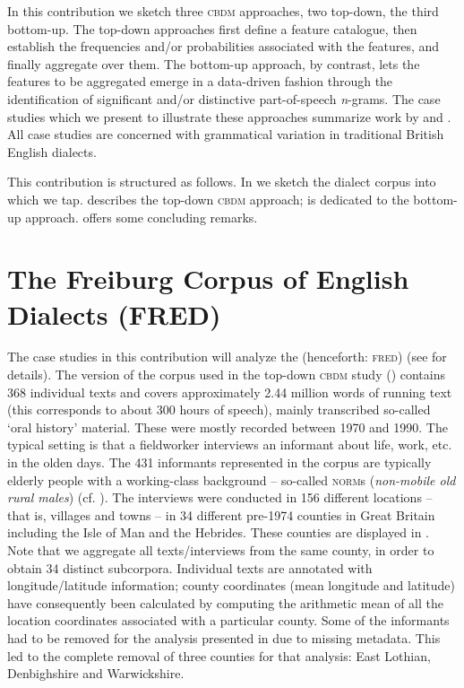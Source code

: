 \documentclass[output=paper]{LSP/langsci}
\begin{document}
In this contribution we sketch three \textsc{cbdm} approaches, two top-down, the third bottom-up. The top-down approaches first define a feature catalogue, then establish the frequencies and/or probabilities associated with the features, and finally aggregate over them. The bottom-up approach, by contrast, lets the features to be aggregated emerge in a data-driven fashion through the identification of significant and/or distinctive part-of-speech \emph{n}-grams. The case studies which we present to illustrate these approaches summarize work by \citet{szmrecsanyi_grammatical_2013} and \citet{wolk_integrating_2014}. All case studies are concerned with grammatical variation in traditional British English dialects.

\largerpage
This contribution is structured as follows. In  we sketch the dialect corpus into which we tap.  describes the top-down \textsc{cbdm} approach;  is dedicated to the bottom-up approach.  offers some concluding remarks.


\section{The Freiburg Corpus of English Dialects (FRED)}\label{FRED}

The case studies in this contribution will analyze the \emph{} (henceforth: \textsc{fred}) (see \citealt{hernandez_users_2006} for details). 
The version of the corpus used in the top-down \textsc{cbdm} study () contains 368 individual texts and covers approximately 2.44 million words of running text (this corresponds to about 300 hours of speech), mainly transcribed so-called `oral history' material. 
These were mostly recorded between 1970 and 1990. 
The typical setting is that a fieldworker interviews an informant about life, work, etc. in the olden days. 
The 431 informants represented in the corpus are typically elderly people with a working-class background -- so-called \textsc{norm}s (\emph{non-mobile old rural males}) (cf. \citealt[29]{chambers_dialectology_1998}). 
The interviews were conducted in 156 different locations -- that is, villages and towns -- in 34 different pre-1974 counties in Great Britain including the Isle of Man and the Hebrides. These counties are displayed in  . 
Note that we aggregate all texts/interviews from the same county, in order to obtain 34 distinct subcorpora.
Individual texts are annotated with longitude/latitude information; county coordinates (mean longitude and latitude) have consequently been calculated by computing the arithmetic mean of all the location coordinates associated with a particular county. 
Some of the informants had to be removed for the analysis presented in  due to missing metadata.
This led to the complete removal of three counties for that analysis: East Lothian, Denbighshire and Warwickshire.
\end{document}
